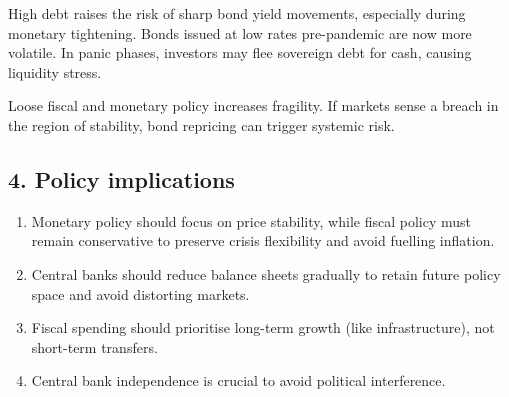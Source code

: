High debt raises the risk of sharp bond yield movements, especially during monetary
tightening. Bonds issued at low rates pre-pandemic are now more volatile. In panic phases,
investors may flee sovereign debt for cash, causing liquidity stress.

Loose fiscal and monetary policy increases fragility. If markets sense a breach in the region
of stability, bond repricing can trigger systemic risk.

\subsection*{4. Policy implications}

\begin{enumerate}[label=\textbf{\alph*)}]
\item Monetary policy should focus on price stability, while fiscal policy must remain
conservative to preserve crisis flexibility and avoid fuelling inflation.
\item Central banks should reduce balance sheets gradually to retain future policy space and
avoid distorting markets.
\item Fiscal spending should prioritise long-term growth (like infrastructure), not short-term
transfers.
\item Central bank independence is crucial to avoid political interference.
\end{enumerate}

